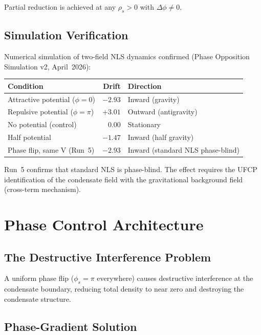 \documentclass[11pt, a4paper]{article}
\begin{document}
Partial reduction is achieved at any $\rho_s > 0$ with
$\Delta\phi \neq 0$.

\subsection{Simulation Verification}

Numerical simulation of two-field NLS dynamics confirmed
(Phase Opposition Simulation v2, April~2026):
\begin{center}
\begin{tabular}{@{}lrl@{}}
\toprule
\textbf{Condition} & \textbf{Drift} & \textbf{Direction} \\
\midrule
Attractive potential ($\phi = 0$) & $-2.93$ & Inward (gravity) \\
Repulsive potential ($\phi = \pi$) & $+3.01$ & Outward (antigravity) \\
No potential (control) & $0.00$ & Stationary \\
Half potential & $-1.47$ & Inward (half gravity) \\
Phase flip, same V (Run~5) & $-2.93$ & Inward (standard NLS phase-blind) \\
\bottomrule
\end{tabular}
\end{center}

Run~5 confirms that standard NLS is phase-blind. The effect
requires the UFCP identification of the condensate field with
the gravitational background field (cross-term mechanism).

\section{Phase Control Architecture}

\subsection{The Destructive Interference Problem}

A uniform phase flip ($\phi_s = \pi$ everywhere) causes
destructive interference at the condensate boundary, reducing
total density to near zero and destroying the condensate
structure.

\subsection{Phase-Gradient Solution}
\end{document}
